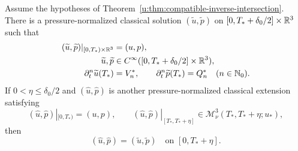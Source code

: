 \begin{theorem}
\label{u:thm:ier-same-history-restart}
Assume the hypotheses of
Theorem~\ref{u:thm:compatible-inverse-intersection}.
There is a pressure-normalized classical solution
\((\widetilde u,\widetilde p)\) on
\([0,T_*+\delta_0/2]\times\mathbb R^3\) such that
\begin{align}
 (\widetilde u,\widetilde p)|_{[0,T_*)\times\mathbb R^3}
 &=(u,p),
 \label{u:eq:ier-extension-identity}\\
 \widetilde u,\widetilde p
 &\in C^\infty([0,T_*+\delta_0/2]\times\mathbb R^3),
 \label{u:eq:ier-extension-smoothness}\\
 \partial_t^n\widetilde u(T_*)&=V_n^*,
 \qquad
 \partial_t^n\widetilde p(T_*)=Q_n^*
 \quad(n\in\mathbb N_0).
 \label{u:eq:ier-extension-jet}
\end{align}
If \(0<\eta\le\delta_0/2\) and
\((\widehat u,\widehat p)\) is another pressure-normalized classical
extension satisfying
\begin{equation}
 (\widehat u,\widehat p)|_{[0,T_*)}=(u,p),
 \qquad
 (\widehat u,\widehat p)|_{[T_*,T_*+\eta]}
 \in\mathscr M_\nu^3(T_*,T_*+\eta;u_*),
 \label{u:eq:ier-same-history-uniqueness-class}
\end{equation}
then
\begin{equation}
 (\widehat u,\widehat p)=(\widetilde u,\widetilde p)
 \quad\text{on }[0,T_*+\eta].
 \label{u:eq:ier-same-history-uniqueness}
\end{equation}
\end{theorem}


